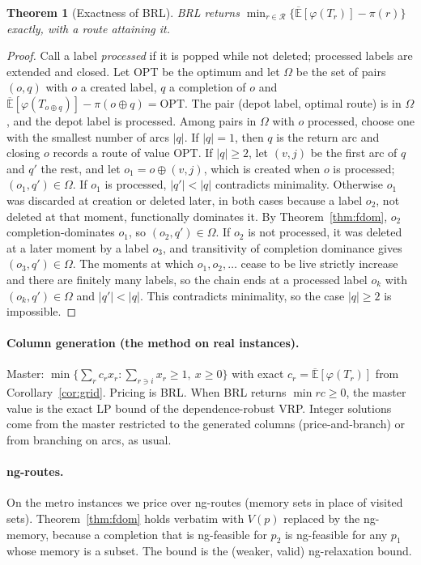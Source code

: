 \documentclass[11pt]{article}
\newtheorem{theorem}{Theorem}[section]
\theoremstyle{definition}
\newcommand{\Eu}{\overline{\mathbb{E}}}
\newcommand{\cR}{\mathcal{R}}
\begin{document}
\begin{theorem}[Exactness of BRL]\label{thm:exact}
BRL returns $\min_{r\in\cR}\{\Eu[\varphi(T_r)]-\pi(r)\}$ exactly, with a route attaining it.
\end{theorem}
\begin{proof}
Call a label \emph{processed} if it is popped while not deleted; processed labels are extended and closed. Let OPT be the optimum and let $\Omega$ be the set of pairs $(o,q)$ with $o$ a created label, $q$ a completion of $o$ and $\Eu[\varphi(T_{o\oplus q})]-\pi(o\oplus q)=\mathrm{OPT}$. The pair (depot label, optimal route) is in $\Omega$, and the depot label is processed. Among pairs in $\Omega$ with $o$ processed, choose one with the smallest number of arcs $|q|$.
If $|q|=1$, then $q$ is the return arc and closing $o$ records a route of value OPT.
If $|q|\ge2$, let $(v,j)$ be the first arc of $q$ and $q'$ the rest, and let $o_1=o\oplus(v,j)$, which is created when $o$ is processed; $(o_1,q')\in\Omega$. If $o_1$ is processed, $|q'|<|q|$ contradicts minimality. Otherwise $o_1$ was discarded at creation or deleted later, in both cases because a label $o_2$, not deleted at that moment, functionally dominates it. By Theorem~\ref{thm:fdom}, $o_2$ completion-dominates $o_1$, so $(o_2,q')\in\Omega$. If $o_2$ is not processed, it was deleted at a later moment by a label $o_3$, and transitivity of completion dominance gives $(o_3,q')\in\Omega$. The moments at which $o_1,o_2,\dots$ cease to be live strictly increase and there are finitely many labels, so the chain ends at a processed label $o_k$ with $(o_k,q')\in\Omega$ and $|q'|<|q|$. This contradicts minimality, so the case $|q|\ge2$ is impossible.
\end{proof}

\paragraph{Column generation (the method on real instances).}
Master: $\min\{\sum_rc_rx_r:\sum_{r\ni i}x_r\ge1,\ x\ge0\}$ with exact $c_r=\Eu[\varphi(T_r)]$ from Corollary~\ref{cor:grid}. Pricing is BRL. When BRL returns $\min rc\ge0$, the master value is the exact LP bound of the dependence-robust VRP. Integer solutions come from the master restricted to the generated columns (price-and-branch) or from branching on arcs, as usual.

\paragraph{ng-routes.} On the metro instances we price over ng-routes (memory sets in place of visited sets). Theorem~\ref{thm:fdom} holds verbatim with $V(p)$ replaced by the ng-memory, because a completion that is ng-feasible for $p_2$ is ng-feasible for any $p_1$ whose memory is a subset. The bound is the (weaker, valid) ng-relaxation bound.
\end{document}
